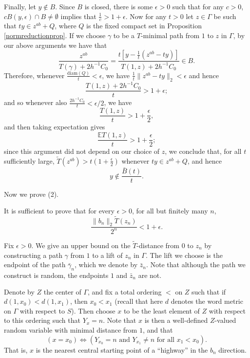 \documentclass[12pt,reqno]{article}
\numberwithin{equation}{section}
\newcommand{\E}{\mathbb{E}}
\newcommand{\diam}{\mathrm{diam}}
\begin{document}
Finally, let $y \notin B$. Since $B$ is closed, there is some $\epsilon > 0$ such that for any $c>0$, $cB(y,\epsilon) \cap B \ne \emptyset$
implies that $\frac{1}{c} > 1 + \epsilon$.
Now for any $t > 0$ let $z \in \Gamma$ be such that $ty \in z^{ab} + Q$, where $Q$ is the fixed compact set in 
Proposition \ref{normreductionprop}. If we choose $\gamma$ to be a $T$-minimal path from $1$ to $z$ in $\Gamma$, by our above arguments
we have that
\[
   \frac{ z^{ab} }{ T(\gamma) + 2 h^{-1} C_0 } = 
   \frac{  t[ y - \frac{1}{t}(z^{ab} - ty) ] }{ T(1,z) + 2 h^{-1} C_0 } \in B.
\]
Therefore, whenever $\frac{ \diam(Q) }{ t } < \epsilon$, we have 
$\frac{1}{t}\|z^{ab} - ty\|_2 < \epsilon$ and hence
\[ \frac{ T(1,z) + 2h^{-1} C_0}{t} > 1 + \epsilon; \]
and so whenever also $\frac{2 h^{-1} C_0 }{t} < \epsilon/2$, we have
\[ \frac{T(1,z)}{t} > 1 + \frac{\epsilon}{2}, \]
and then taking expectation gives
\[ \frac{ \E T(1,z) }{t} > 1 + \frac{\epsilon}{2}; \]
since this argument did not depend on our choice of $z$, we conclude that, for all $t$ sufficiently large,
$\tilde{T}(z^{ab}) > t(1 + \frac{\epsilon}{2})$ whenever $ty \in z^{ab} + Q$, and hence 
\[ y \notin \frac{\bar{B}(t)}{t}. \]








Now we prove (2).

It is sufficient to prove that for every $\epsilon > 0$, for all but finitely many $n$,
\[ \frac{ \|b_n\|_2 \tilde{T}(z_n) }{ 2^n } < 1 + \epsilon. \]


Fix $\epsilon > 0$. We give an upper bound on the $\tilde{T}$-distance from $0$ to $z_n$ 
by constructing a path $\gamma$ from $1$ to a lift of $z_n$ in $\Gamma$. The lift we choose is the endpoint of the path $\bar{\gamma}_n$,
which we denote by $\bar{z}_n$. Note that although the path we construct is random, the endpoints $1$ and $\bar{z}_n$ are not.

Denote by $Z$ the center of $\Gamma$, and fix a total ordering $<$ on $Z$ such that if $d(1,x_0) < d(1,x_1)$, then $x_0 < x_1$
(recall that here $d$ denotes the word metric on $\Gamma$ with respect to $S$).
Then choose $x$ to be the least element of $Z$ with respect to this ordering such that $Y_x = n$.
Note that $x$ is then a well-defined $Z$-valued random variable with minimal distance from $1$, and that
\[
   (x=x_0) \Leftrightarrow (Y_{x_0} = n \mbox{ and } Y_{x_1} \ne n \mbox{ for all } x_1 < x_0).
\]
That is, $x$ is the nearest central starting point of a ``highway'' in the $b_n$ direction.
\end{document}
